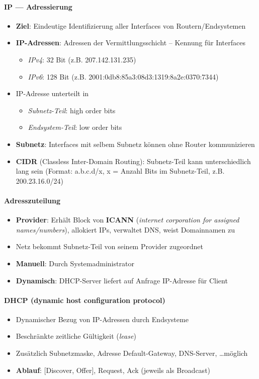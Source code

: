 \paragraph{IP --- Adressierung}
\begin{itemize}
  \item \textbf{Ziel}: Eindeutige Identifizierung aller Interfaces von Routern/Endsystemen
  \item \textbf{IP-Adressen}: Adressen der Vermittlungsschicht -- Kennung für Interfaces
  \begin{itemize}
    \item \emph{IPv4}: 32 Bit (z.B. 207.142.131.235)
    \item \emph{IPv6}: 128 Bit (z.B. 2001:0db8:85a3:08d3:1319:8a2e:0370:7344)
  \end{itemize}
  \item IP-Adresse unterteilt in
  \begin{itemize}
    \item \emph{Subnetz-Teil}: high order bits
    \item \emph{Endsystem-Teil}: low order bits
  \end{itemize}
  \item \textbf{Subnetz}: Interfaces mit selbem Subnetz können ohne Router kommunizieren
  \item \textbf{CIDR} (Classless Inter-Domain Routing): Subnetz-Teil kann unterschiedlich lang sein (Format: a.b.c.d/x, x = Anzahl Bits im Subnetz-Teil, z.B. 200.23.16.0/24)
  	
\end{itemize}

\paragraph{Adresszuteilung}
\begin{itemize}
	\item \textbf{Provider}: Erhält Block von \textbf{ICANN} (\emph{internet corporation for assigned names/numbers}), allokiert IPs, verwaltet DNS, weist Domainnamen zu
	\item Netz bekommt Subnetz-Teil von seinem Provider zugeordnet
  \item \textbf{Manuell}: Durch Systemadministrator
  \item \textbf{Dynamisch}: DHCP-Server liefert auf Anfrage IP-Adresse für Client
\end{itemize}

\paragraph{DHCP (dynamic host configuration protocol)}
\begin{itemize}
	\item Dynamischer Bezug von IP-Adressen durch Endsysteme
	\item Beschränkte zeitliche Gültigkeit (\emph{lease})
	\item Zusätzlich Subnetzmaske, Adresse Default-Gateway, DNS-Server, \dots möglich
	\item \textbf{Ablauf}: [Discover, Offer], Request, Ack (jeweils als Broadcast)
\end{itemize}

